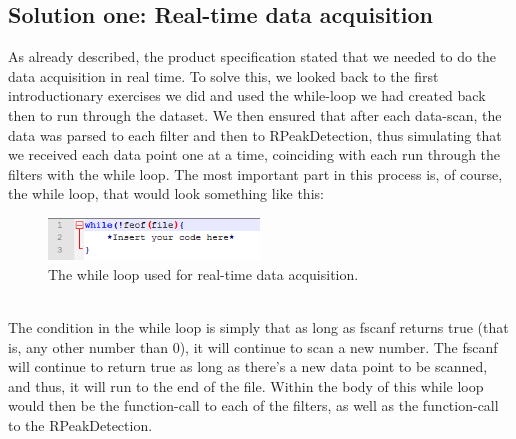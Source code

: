 \documentclass[12pt,a4paper]{article}
\begin{document}
\subsection{Solution one: Real-time data acquisition}
As already described, the product specification stated that we needed to do the data acquisition in real time. To solve this, we looked back to the first introductionary exercises we did and used the while-loop we had created back then to run through the dataset. We then ensured that after each data-scan, the data was parsed to each filter and then to RPeakDetection, thus simulating that we received each data point one at a time, coinciding with each run through the filters with the while loop. The most important part in this process is, of course, the while loop, that would look something like this:\\
\begin{figure}[h!]
  \centering
    \includegraphics[width=0.5\textwidth]{whileloop.png}
  \caption{The while loop used for real-time data acquisition.}
\end{figure}
\\
The condition in the while loop is simply that as long as fscanf returns true (that is, any other number than 0), it will continue to scan a new number. The fscanf will continue to return true as long as there's a new data point to be scanned, and thus, it will run to the end of the file. Within the body of this while loop would then be the function-call to each of the filters, as well as the function-call to the RPeakDetection. 
\end{document}
